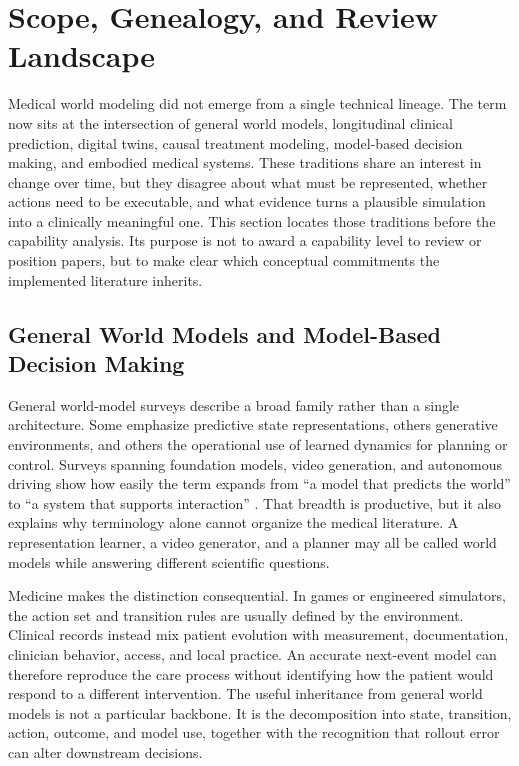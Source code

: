\section{Scope, Genealogy, and Review Landscape}
\label{sec:background}

Medical world modeling did not emerge from a single technical lineage. The term now sits at the intersection of general world models, longitudinal clinical prediction, digital twins, causal treatment modeling, model-based decision making, and embodied medical systems. These traditions share an interest in change over time, but they disagree about what must be represented, whether actions need to be executable, and what evidence turns a plausible simulation into a clinically meaningful one. This section locates those traditions before the capability analysis. Its purpose is not to award a capability level to review or position papers, but to make clear which conceptual commitments the implemented literature inherits.

\subsection{General World Models and Model-Based Decision Making}

General world-model surveys describe a broad family rather than a single architecture. Some emphasize predictive state representations, others generative environments, and others the operational use of learned dynamics for planning or control. Surveys spanning foundation models, video generation, and autonomous driving show how easily the term expands from ``a model that predicts the world'' to ``a system that supports interaction'' \citep{Zhu2024IsSoraWorld,Ding2025UnderstandingWorldPredicting,Feng2025SurveyWorldModels}. That breadth is productive, but it also explains why terminology alone cannot organize the medical literature. A representation learner, a video generator, and a planner may all be called world models while answering different scientific questions.

Medicine makes the distinction consequential. In games or engineered simulators, the action set and transition rules are usually defined by the environment. Clinical records instead mix patient evolution with measurement, documentation, clinician behavior, access, and local practice. An accurate next-event model can therefore reproduce the care process without identifying how the patient would respond to a different intervention. The useful inheritance from general world models is not a particular backbone. It is the decomposition into state, transition, action, outcome, and model use, together with the recognition that rollout error can alter downstream decisions.

